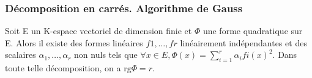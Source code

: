 \subsubsection{ Décomposition en carrés. Algorithme de Gauss}
%
\begin{thm} 
	Soit E un K-espace vectoriel
de dimension finie et $\Phi$ une forme quadratique sur E. Alors il existe
des formes linéaires
$f1,\ldots,fr$
linéairement indépendantes et des scalaires
$\alpha_1,\ldots,\alpha_r$
non nuls tels que $\forall x \in E, \Phi(x)
= \sum_{i=1}^r \alpha_i fi(x)^2$. Dans toute
telle décomposition, on a
$\mathrm{rg} \Phi = r$.
\end{thm}
%
%
%
%
%
%
